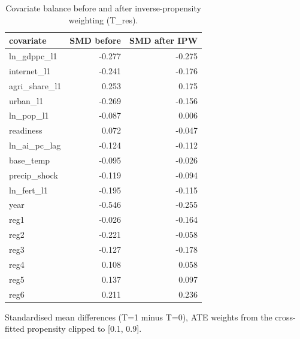 \begin{table}[htbp]
\centering
\caption{Covariate balance before and after inverse-propensity weighting (T\_res).}
\label{tab:agri_balance}
\begin{tabular}{lrr}
\toprule
covariate & SMD before & SMD after IPW \\
\midrule
ln\_gdppc\_l1 & -0.277 & -0.275 \\
internet\_l1 & -0.241 & -0.176 \\
agri\_share\_l1 & 0.253 & 0.175 \\
urban\_l1 & -0.269 & -0.156 \\
ln\_pop\_l1 & -0.087 & 0.006 \\
readiness & 0.072 & -0.047 \\
ln\_ai\_pc\_lag & -0.124 & -0.112 \\
base\_temp & -0.095 & -0.026 \\
precip\_shock & -0.119 & -0.094 \\
ln\_fert\_l1 & -0.195 & -0.115 \\
year & -0.546 & -0.255 \\
reg1 & -0.026 & -0.164 \\
reg2 & -0.221 & -0.058 \\
reg3 & -0.127 & -0.178 \\
reg4 & 0.108 & 0.058 \\
reg5 & 0.137 & 0.097 \\
reg6 & 0.211 & 0.236 \\
\bottomrule
\end{tabular}
\par\smallskip\footnotesize Standardised mean differences (T=1 minus T=0), ATE weights from the cross-fitted propensity clipped to [0.1, 0.9].
\end{table}

